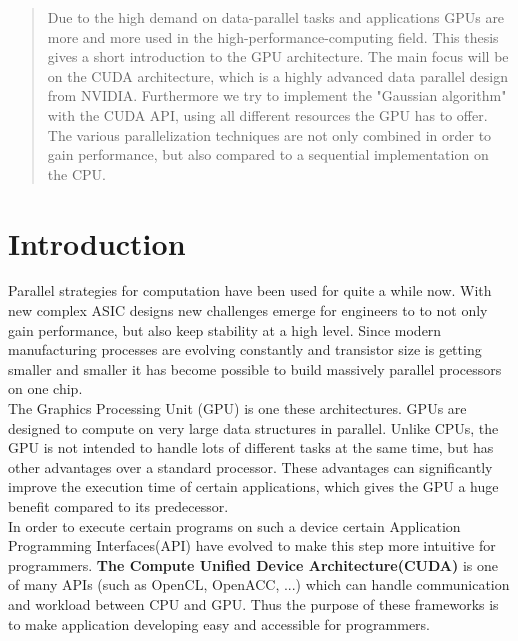 \documentclass[draft, final]{vutinfth} %
\begin{document}
\begin{abstract}
	Due to the high demand on data-parallel tasks and applications GPUs are more and more used in the high-performance-computing field. This thesis gives a short introduction to the GPU architecture. The main focus will be on the CUDA architecture, which is a highly advanced data parallel design from NVIDIA. Furthermore we try to implement the "Gaussian algorithm" with the CUDA API, using all different resources the GPU has to offer. The various parallelization techniques are not only combined in order to gain performance, but also compared to a sequential implementation on the CPU.
\end{abstract}


\tableofcontents %

\mainmatter



\chapter{Introduction}
	Parallel strategies for computation have been used for quite a while now. With new complex ASIC designs new challenges emerge for engineers to to not only gain performance, but also keep stability at a high level. Since modern manufacturing processes are evolving constantly and transistor size is getting smaller and smaller it has become possible to build massively parallel processors on one chip.\\
	The Graphics Processing Unit (GPU) is one these architectures. GPUs are designed to compute on very large data structures in parallel. Unlike CPUs, the GPU is not intended to handle lots of different tasks at the same time, but has other advantages over a standard processor. These advantages can significantly improve the execution time of certain applications, which gives the GPU a huge benefit compared to its predecessor.\\
	In order to execute certain programs on such a device certain Application Programming Interfaces(API) have evolved to make this step more intuitive for programmers. \textbf{The Compute Unified Device Architecture(CUDA)} \cite{Sanders:2010:CEI:1891996} is one of many APIs (such as OpenCL, OpenACC, ...) which can handle communication and workload between CPU and GPU. Thus the purpose of these frameworks is to make application developing easy and accessible for programmers.
\end{document}
